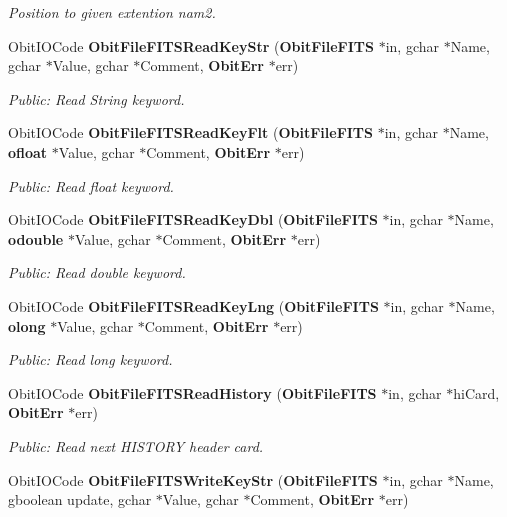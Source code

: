 \begin{CompactItemize}
\begin{CompactList}\small\item\em Position to given extention nam2. \item\end{CompactList}\item 
Obit\-IOCode {\bf Obit\-File\-FITSRead\-Key\-Str} ({\bf Obit\-File\-FITS} $\ast$in, gchar $\ast$Name, gchar $\ast$Value, gchar $\ast$Comment, {\bf Obit\-Err} $\ast$err)
\begin{CompactList}\small\item\em Public: Read String keyword. \item\end{CompactList}\item 
Obit\-IOCode {\bf Obit\-File\-FITSRead\-Key\-Flt} ({\bf Obit\-File\-FITS} $\ast$in, gchar $\ast$Name, {\bf ofloat} $\ast$Value, gchar $\ast$Comment, {\bf Obit\-Err} $\ast$err)
\begin{CompactList}\small\item\em Public: Read float keyword. \item\end{CompactList}\item 
Obit\-IOCode {\bf Obit\-File\-FITSRead\-Key\-Dbl} ({\bf Obit\-File\-FITS} $\ast$in, gchar $\ast$Name, {\bf odouble} $\ast$Value, gchar $\ast$Comment, {\bf Obit\-Err} $\ast$err)
\begin{CompactList}\small\item\em Public: Read double keyword. \item\end{CompactList}\item 
Obit\-IOCode {\bf Obit\-File\-FITSRead\-Key\-Lng} ({\bf Obit\-File\-FITS} $\ast$in, gchar $\ast$Name, {\bf olong} $\ast$Value, gchar $\ast$Comment, {\bf Obit\-Err} $\ast$err)
\begin{CompactList}\small\item\em Public: Read long keyword. \item\end{CompactList}\item 
Obit\-IOCode {\bf Obit\-File\-FITSRead\-History} ({\bf Obit\-File\-FITS} $\ast$in, gchar $\ast$hi\-Card, {\bf Obit\-Err} $\ast$err)
\begin{CompactList}\small\item\em Public: Read next HISTORY header card. \item\end{CompactList}\item 
Obit\-IOCode {\bf Obit\-File\-FITSWrite\-Key\-Str} ({\bf Obit\-File\-FITS} $\ast$in, gchar $\ast$Name, gboolean update, gchar $\ast$Value, gchar $\ast$Comment, {\bf Obit\-Err} $\ast$err)

\end{CompactItemize}
